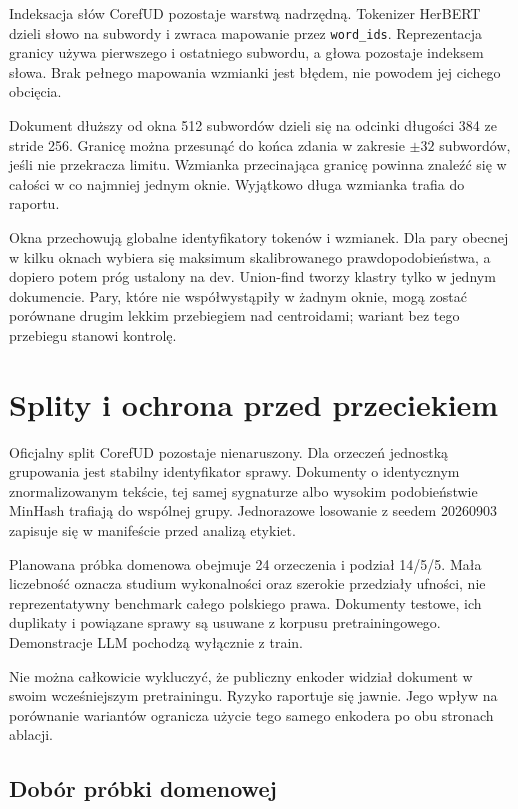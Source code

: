 Indeksacja słów CorefUD pozostaje warstwą nadrzędną. Tokenizer HerBERT dzieli słowo na subwordy i zwraca mapowanie przez \texttt{word\_ids}. Reprezentacja granicy używa pierwszego i ostatniego subwordu, a głowa pozostaje indeksem słowa. Brak pełnego mapowania wzmianki jest błędem, nie powodem jej cichego obcięcia.

Dokument dłuższy od okna 512 subwordów dzieli się na odcinki długości 384 ze stride 256. Granicę można przesunąć do końca zdania w zakresie $\pm32$ subwordów, jeśli nie przekracza limitu. Wzmianka przecinająca granicę powinna znaleźć się w całości w co najmniej jednym oknie. Wyjątkowo długa wzmianka trafia do raportu.

Okna przechowują globalne identyfikatory tokenów i wzmianek. Dla pary obecnej w kilku oknach wybiera się maksimum skalibrowanego prawdopodobieństwa, a dopiero potem próg ustalony na dev. Union-find tworzy klastry tylko w jednym dokumencie. Pary, które nie współwystąpiły w żadnym oknie, mogą zostać porównane drugim lekkim przebiegiem nad centroidami; wariant bez tego przebiegu stanowi kontrolę.

\section{Splity i ochrona przed przeciekiem}
\label{sec:splity}

Oficjalny split CorefUD pozostaje nienaruszony. Dla orzeczeń jednostką grupowania jest stabilny identyfikator sprawy. Dokumenty o identycznym znormalizowanym tekście, tej samej sygnaturze albo wysokim podobieństwie MinHash trafiają do wspólnej grupy. Jednorazowe losowanie z seedem 20260903 zapisuje się w manifeście przed analizą etykiet.

Planowana próbka domenowa obejmuje 24 orzeczenia i podział 14/5/5. Mała liczebność oznacza studium wykonalności oraz szerokie przedziały ufności, nie reprezentatywny benchmark całego polskiego prawa. Dokumenty testowe, ich duplikaty i powiązane sprawy są usuwane z korpusu pretrainingowego. Demonstracje LLM pochodzą wyłącznie z train.

Nie można całkowicie wykluczyć, że publiczny enkoder widział dokument w swoim wcześniejszym pretrainingu. Ryzyko raportuje się jawnie. Jego wpływ na porównanie wariantów ogranicza użycie tego samego enkodera po obu stronach ablacji.

\subsection{Dobór próbki domenowej}

